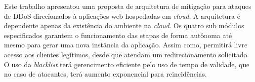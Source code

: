 Este trabalho apresentou uma proposta de arquitetura de mitigação para ataques de DDoS direcionados à aplicações web hospedadas em \emph{cloud}. A arquitetura é dependente apenas da existência do ambiente na \emph{cloud}. Os quatro sub módulos especificados garantem o funcionamento das etapas de forma autônoma até mesmo para gerar uma nova instância da aplicação. Assim como, permitirá livre acesso aos clientes legítimos, desde que atendam um redirecionamento solicitado. O uso da \emph{blacklist} terá gerencimento eficiente pelo uso de tempo de validade, que no caso de atacantes, terá aumento exponencial para reincidências.

